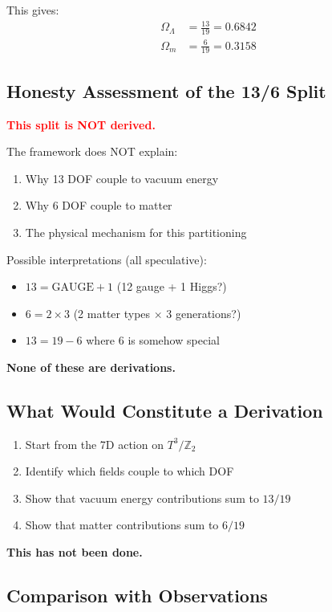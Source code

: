 \documentclass[12pt,a4paper]{article}
\begin{document}
This gives:
\begin{align}
\Omega_\Lambda &= \frac{13}{19} = 0.6842 \\
\Omega_m &= \frac{6}{19} = 0.3158
\end{align}

\subsection{Honesty Assessment of the 13/6 Split}

\textcolor{red}{\textbf{This split is NOT derived.}}

The framework does NOT explain:
\begin{enumerate}
    \item Why 13 DOF couple to vacuum energy
    \item Why 6 DOF couple to matter
    \item The physical mechanism for this partitioning
\end{enumerate}

Possible interpretations (all speculative):
\begin{itemize}
    \item $13 = \text{GAUGE} + 1$ (12 gauge + 1 Higgs?)
    \item $6 = 2 \times 3$ (2 matter types $\times$ 3 generations?)
    \item $13 = 19 - 6$ where 6 is somehow special
\end{itemize}

\textbf{None of these are derivations.}

\subsection{What Would Constitute a Derivation}

\begin{enumerate}
    \item Start from the 7D action on $T^3/\mathbb{Z}_2$
    \item Identify which fields couple to which DOF
    \item Show that vacuum energy contributions sum to $13/19$
    \item Show that matter contributions sum to $6/19$
\end{enumerate}

\textbf{This has not been done.}

\subsection{Comparison with Observations}
\end{document}
